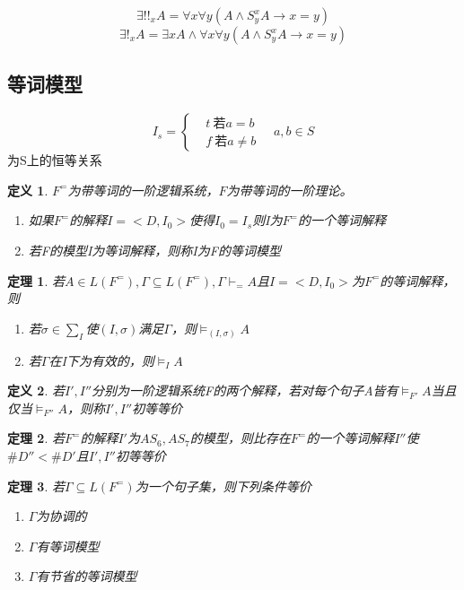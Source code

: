 \documentclass[a4paper]{ctexart}
\newtheorem{thm}{\hspace{2em}定理}[subsection]
\newtheorem{defi}{\hspace{2em}定义}[subsection]
\begin{document}
$$\exists!!_xA=\forall{x}\forall{y}(A\wedge S_y^xA\rightarrow x=y)$$
$$\exists!_xA=\exists{x}A\wedge\forall{x}\forall{y}(A\wedge S_y^xA\rightarrow x=y)$$

\subsection{等词模型}
$$I_s=\left\{
\begin{aligned}
  &t \ \text{若}a=b\\
  &f \ \text{若}a\neq b
\end{aligned}\right. \quad a,b\in S
$$
为S上的恒等关系
\begin{defi}
  $F^=$为带等词的一阶逻辑系统，$F$为带等词的一阶理论。
  \begin{enumerate}[itemindent=2em]
    \item 如果$F^=$的解释$I=<D,I_0>$使得$I_0=I_s$则I为$F^=$的一个等词解释
    \item 若F的模型I为等词解释，则称I为F的等词模型
  \end{enumerate}
\end{defi}

\begin{thm}
  若$A\in L(F^=),\Gamma\subseteq L(F^=),\Gamma\vdash_=A$且$I=<D,I_0>$为$F^=$的等词解释，则
  \begin{enumerate}[itemindent=2em]
    \item 若$\sigma\in\sum_I$使$(I,\sigma)$满足$\Gamma$，则$\models_{(I,\sigma)}A$
    \item 若$\Gamma$在I下为有效的，则$\models_{I}A$
  \end{enumerate}
\end{thm}

\begin{defi}
  若$I',I''$分别为一阶逻辑系统F的两个解释，若对每个句子A皆有$\models_{F'}A$当且仅当$\models_{F''}A$，则称$I',I''$初等等价
\end{defi}

\begin{thm}
  若$F^=$的解释$I'$为$AS_6,AS_7$的模型，则比存在$F^=$的一个等词解释$I''$使$\#D''<\#D'$且$I',I''$初等等价
\end{thm}

\begin{thm}
  若$\Gamma\subseteq L(F^=)$为一个句子集，则下列条件等价
  \begin{enumerate}[itemindent=2em]
    \item $\Gamma$为协调的
    \item $\Gamma$有等词模型
    \item $\Gamma$有节省的等词模型
  \end{enumerate}
\end{thm}
\end{document}
